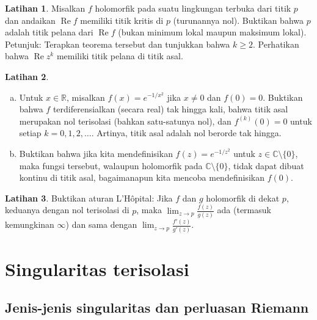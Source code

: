 \documentclass[12pt,openany]{book}
\renewcommand{\Re}{\operatorname{Re}}
\newcommand{\C}{{\mathbb{C}}}
\newcommand{\R}{{\mathbb{R}}}
\theoremstyle{plain}
\theoremstyle{remark}
\theoremstyle{definition}
\newenvironment{exbox}{%
    \def\FrameCommand{\vrule width 1pt \relax\hspace{10pt}}%
    \MakeFramed{\advance\hsize-\width\FrameRestore}%
}{%
    \endMakeFramed
}
\newenvironment{exparts}{%
    \leavevmode\begin{enumerate}[a),noitemsep,topsep=0pt,parsep=0pt,partopsep=0pt]
}{%
    \end{enumerate}
}
\theoremstyle{exercise}
\newtheorem{exercise}{Latihan}[section]
\theoremstyle{example}
\begin{document}
\begin{exbox}
\begin{exercise}
Misalkan $f$ holomorfik pada suatu lingkungan terbuka dari titik $p$
dan andaikan $\Re f$ memiliki titik kritis di $p$ (turunannya nol).
Buktikan bahwa $p$ adalah titik pelana dari $\Re f$ (bukan minimum lokal maupun maksimum lokal).
Petunjuk: Terapkan teorema tersebut dan tunjukkan bahwa $k \geq 2$. Perhatikan bahwa $\Re z^k$ memiliki
titik pelana di titik asal.
\end{exercise}

\begin{exercise}
\begin{exparts}
\item
Untuk $x \in \R$, misalkan $f(x) = e^{-1/x^2}$ jika $x \neq 0$ dan $f(0) = 0$.
Buktikan bahwa $f$ terdiferensialkan (secara real) tak hingga kali, bahwa titik asal merupakan
nol terisolasi (bahkan satu-satunya nol), dan $f^{(k)}(0) = 0$ untuk
setiap $k=0,1,2,\ldots$. Artinya, titik asal adalah nol berorde tak hingga.
\item
Buktikan bahwa
jika kita mendefinisikan $f(z) = e^{-1/z^2}$ untuk
$z \in \C \setminus \{ 0 \}$,
maka fungsi tersebut, walaupun holomorfik pada
$\C \setminus \{ 0 \}$, tidak dapat dibuat
kontinu di titik asal, bagaimanapun kita mencoba mendefinisikan $f(0)$.
\end{exparts}
\end{exercise}

\begin{exercise}
Buktikan aturan L'H\^{o}pital: Jika $f$ dan $g$ holomorfik di dekat $p$,
keduanya dengan nol terisolasi di $p$,
maka $\lim_{z\to p} \frac{f(z)}{g(z)}$ ada (termasuk kemungkinan $\infty$)
dan sama dengan
$\lim_{z\to p} \frac{f'(z)}{g'(z)}$.
\end{exercise}
\end{exbox}


\section{Singularitas terisolasi}

\subsection{Jenis-jenis singularitas dan perluasan Riemann}
\end{document}
